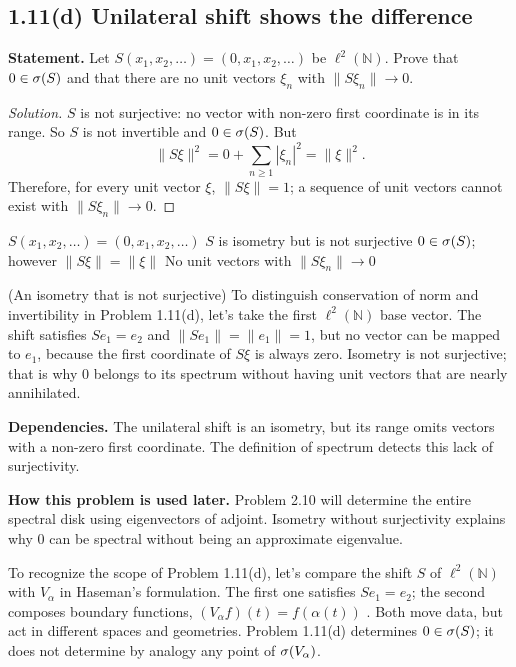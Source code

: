 \subsection*{1.11(d) Unilateral shift shows the difference}

\noindent\textbf{Statement.} Let $S(x_1,x_2,\ldots)=(0,x_1,x_2,\ldots)$ be
$\ell^2(\mathbb N)$. Prove that $0\in\sigma(S)$ and that there are no unit vectors
$\xi_n$ with $\|S\xi_n\|\to0$.

\begin{proof}[Solution]
$S$ is not surjective: no vector with non-zero first coordinate is in its range. So $S$ is not invertible and $0\in\sigma(S)$. But
\[
 \|S\xi\|^2=0+\sum_{n\ge1}|\xi_n|^2=\|\xi\|^2.
\]
Therefore, for every unit vector $\xi$, $\|S\xi\|=1$; a sequence of unit vectors cannot exist with
$\|S\xi_n\|\to0$.
\end{proof}

\proofdiagram
{$S(x_1,x_2,\dots)=(0,x_1,x_2,\dots)$}
{$S$ is isometry but is not surjective}
{$0\in\sigma(S)$; however $\|S\xi\|=\|\xi\|$}
{No unit vectors with $\|S\xi_n\|\to0$}

\begin{cthejemplo}{(An isometry that is not surjective)}
To distinguish conservation of norm and invertibility in Problem 1.11(d), let's take the first
$\ell^2(\mathbb N)$ base vector.
The shift satisfies $Se_1=e_2$ and $\|Se_1\|=\|e_1\|=1$, but no vector can be mapped to $e_1$, because the first coordinate of $S\xi$ is always zero.
Isometry is not surjective; that is why $0$ belongs to its spectrum without having unit vectors that are nearly annihilated.
\end{cthejemplo}

\noindent\textbf{Dependencies.} The unilateral shift is an isometry, but its range omits vectors with a non-zero first coordinate. The definition of spectrum detects this lack of surjectivity.

\noindent\textbf{How this problem is used later.} Problem 2.10 will determine the entire spectral disk using eigenvectors of adjoint. Isometry without surjectivity explains why $0$ can be spectral without being an approximate eigenvalue.

\begin{investigacion}[title={Two shifts in different spaces}]
To recognize the scope of Problem 1.11(d), let's compare the shift $S$ of $\ell^2(\mathbb N)$ with
$V_\alpha$ in Haseman's formulation. The first one satisfies $Se_1=e_2$; the second
composes boundary functions, $(V_\alpha f)(t)=f(\alpha(t))$
\cite[pp.~463--464, ecs.~(1.1)--(1.2)]{Karlovich2017}.
Both move data, but act in different spaces and geometries. Problem 1.11(d)
determines $0\in\sigma(S)$; it does not determine by analogy any point of $\sigma(V_\alpha)$.
\end{investigacion}

